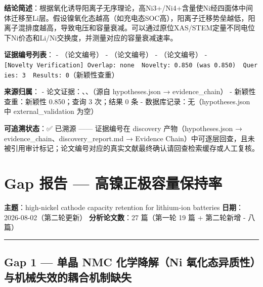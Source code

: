 \documentclass[12pt,a4paper]{ctexart}
\begin{document}
\textbf{结论简述}：根据氧化诱导阳离子无序理论，高Ni3+/Ni4+含量使Ni经四面体中间体迁移至Li层。假设镍氧化态越高（如充电态SOC高），阳离子迁移势垒越低，阳离子混排度越高，导致电压和容量衰减。可以通过原位XAS/STEM定量不同电位下Ni价态和Li/Ni交换度，并测量对应的容量衰减速率。

\textbf{证据编号列表}： - \texttt{\cite{p27}}（论文编号） - \texttt{\cite{p32}}（论文编号） - \texttt{\cite{p24}}（论文编号） - \texttt{{[}Novelty\ Verification{]}\ Overlap:\ none\ \textbar{}\ Novelty:\ 0.850\ (was\ 0.850)\ \textbar{}\ Queries:\ 3\ \textbar{}\ Results:\ 0}（新颖性查重）

\textbf{来源归属}： - 论文证据：\texttt{\cite{p27}}、\texttt{\cite{p32}}、\texttt{\cite{p24}}（源自 hypotheses.json → evidence\_chain） - 新颖性查重：新颖性 0.850；查询 3 次；结果 0 条 - 数据库记录：无（hypotheses.json 中 external\_validation 为空）

\textbf{可追溯状态}：✅ 已溯源 ------ 证据编号在 discovery 产物（hypotheses.json → evidence\_chain、discovery\_report.md → Evidence Chain）中可逐层回查，且未被引用审计标记；论文编号对应的真实文献最终确认请回查检索缓存或人工复核。

\section{Gap 报告 --- 高镍正极容量保持率}\label{gap:gap-ux62a5ux544a-ux9ad8ux954dux6b63ux6781ux5bb9ux91cfux4fddux6301ux7387}

\textbf{主题}：high-nickel cathode capacity retention for lithium-ion batteries \textbf{日期}：2026-08-02（第二轮更新） \textbf{分析论文数}：27 篇（第一轮 19 篇 + 第二轮新增 \cite{p43}-\cite{p50} 八篇）

\begin{center}\rule{0.5\linewidth}{0.5pt}\end{center}

\subsection{Gap 1 --- 单晶 NMC 化学降解（Ni 氧化态异质性）与机械失效的耦合机制缺失}\label{gap:gap-1-ux5355ux6676-nmc-ux5316ux5b66ux964dux89e3ni-ux6c27ux5316ux6001ux5f02ux8d28ux6027ux4e0eux673aux68b0ux5931ux6548ux7684ux8026ux5408ux673aux5236ux7f3aux5931}
\end{document}
